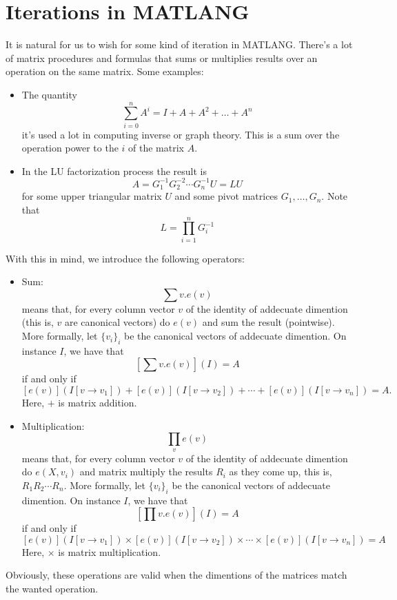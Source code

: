 \section{Iterations in MATLANG}
It is natural for us to wish for some kind of iteration in MATLANG. There's a lot of matrix procedures and formulas that sums or multiplies results over an operation on the same matrix. Some examples:
\begin{itemize}
	\item The quantity $$\sum_{i=0}^nA^i=I+A+A^2+\ldots + A^n$$ it's used a lot in computing inverse or graph theory. This is a sum over the operation power to the $i$ of the matrix $A$.
	\item In the LU factorization process the result is $$A=G_1^{-1}G_2^{-2}\cdots G_n^{-1}U=LU$$ for some upper triangular matrix $U$ and some pivot matrices $G_1, \ldots, G_n$. Note that $$L=\prod_{i=1}^nG_{i}^{-1}$$
\end{itemize}

With this in mind, we introduce the following operators:
\begin{itemize}
	\item Sum: $$\sum v.e(v)$$ means that, for every column vector $v$ of the identity of addecuate dimention (this is, $v$ are canonical vectors) do $e(v)$ and sum the result (pointwise). More formally, let $\lbrace v_i\rbrace_i$ be the canonical vectors of addecuate dimention. On instance $I$, we have that $$\left[\sum v. e(v)\right](I)=A$$ if and only if $$\left[ e(v)\right](I[v\rightarrow v_1]) + \left[ e(v)\right](I[v\rightarrow v_2]) + \cdots + \left[ e(v)\right](I[v\rightarrow v_n]) = A.$$ Here, $+$ is matrix addition.
	\item Multiplication: $$\prod_{v}e(v)$$ means that, for every column vector $v$ of the identity of addecuate dimention do $e(X,v_i)$ and matrix multiply the results $R_i$ as they come up, this is, $R_1R_2\cdots R_n$. More formally, let $\lbrace v_i\rbrace_i$ be the canonical vectors of addecuate dimention. On instance $I$, we have that $$\left[\prod v. e(v)\right](I)=A$$ if and only if $$\left[ e(v)\right](I[v\rightarrow v_1]) \times \left[ e(v)\right](I[v\rightarrow v_2]) \times \cdots \times \left[ e(v)\right](I[v\rightarrow v_n]) = A$$ Here, $\times$ is matrix multiplication.
\end{itemize}

Obviously, these operations are valid when the dimentions of the matrices match the wanted operation. \\

